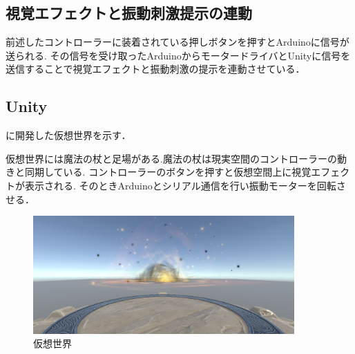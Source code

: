 \subsection{視覚エフェクトと振動刺激提示の連動}
前述したコントローラーに装着されている押しボタンを押すとArduinoに信号が送られる.
その信号を受け取ったArduinoからモータードライバとUnityに信号を送信することで視覚エフェクトと振動刺激の提示を連動させている．

\subsection{Unity}
に開発した仮想世界を示す．

仮想世界には魔法の杖と足場がある.魔法の杖は現実空間のコントローラーの動きと同期している.
コントローラーのボタンを押すと仮想空間上に視覚エフェクトが表示される.
そのときArduinoとシリアル通信を行い振動モーターを回転させる．

\begin{figure}[h]
\centering
\includegraphics[clip,width=10cm]{fig/unity.png}
\caption{仮想世界}\label{virtualworld}
\end{figure}